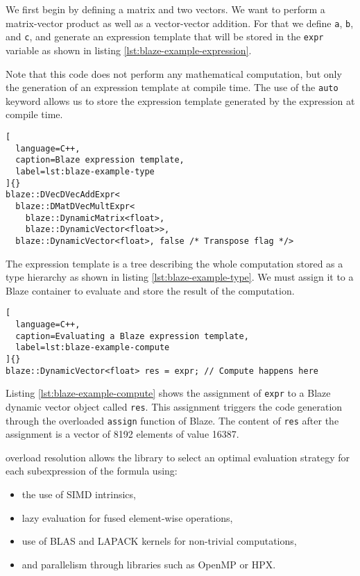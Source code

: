 \documentclass[../paper.tex]{subfiles}
\begin{document}
We first begin by defining a matrix and two vectors.
We want to perform a matrix-vector product as well as a vector-vector addition.
For that we define \lstinline{a}, \lstinline{b}, and \lstinline{c},
and generate an expression template that will be stored in the \lstinline{expr}
variable as shown in listing \ref{lst:blaze-example-expression}.

Note that this code does not perform any mathematical computation,
but only the generation of an expression template at compile time.
The use of the \lstinline{auto} keyword allows us to store the expression
template generated by the expression at compile time.

\begin{lstlisting}[
  language=C++,
  caption=Blaze expression template,
  label=lst:blaze-example-type
]{}
blaze::DVecDVecAddExpr<
  blaze::DMatDVecMultExpr<
    blaze::DynamicMatrix<float>,
    blaze::DynamicVector<float>>,
  blaze::DynamicVector<float>, false /* Transpose flag */>
\end{lstlisting}

The expression template is a tree describing the whole computation
stored as a type hierarchy as shown in listing \ref{lst:blaze-example-type}.
We must assign it to a Blaze container to evaluate and store
the result of the computation.

\begin{lstlisting}[
  language=C++,
  caption=Evaluating a Blaze expression template,
  label=lst:blaze-example-compute
]{}
blaze::DynamicVector<float> res = expr; // Compute happens here
\end{lstlisting}

Listing \ref{lst:blaze-example-compute} shows the assignment of \lstinline{expr}
to a Blaze dynamic vector object called \lstinline{res}.
This assignment triggers the code generation through the overloaded
\lstinline{assign} function of Blaze.
The content of \lstinline{res} after the assignment is a vector of 8192 elements
of value 16387.

\cpp overload resolution allows the library to select an optimal evaluation
strategy for each subexpression of the formula using:

\begin{itemize}
\item the use of SIMD intrinsics,
\item lazy evaluation for fused element-wise operations,
\item use of BLAS and LAPACK kernels for non-trivial computations,
\item and parallelism through libraries such as OpenMP or HPX\cite{hpx}.
\end{itemize}
\end{document}
